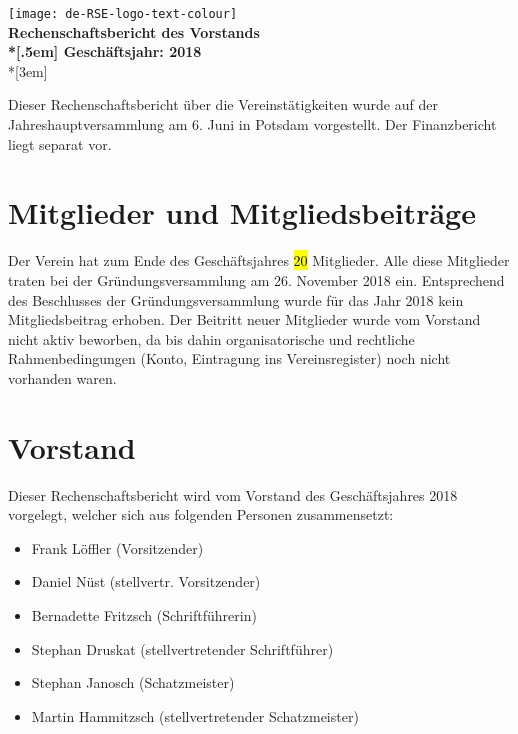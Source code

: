 \newcommand{\jahr}{2018}



\thispagestyle{empty}

\begin{centering}
\texttt{[image: de-RSE-logo-text-colour]}\\
\vspace{3em}
\textbf{
 \Large Rechenschaftsbericht des Vorstands\\*[.5em]
 \normalsize Geschäftsjahr: \jahr}\\*[3em]
\end{centering}



Dieser Rechenschaftsbericht über die Vereinstätigkeiten wurde auf der Jahreshauptversammlung am 6. Juni in Potsdam vorgestellt.
Der Finanzbericht liegt separat vor.

\section{Mitglieder und Mitgliedsbeiträge}

Der Verein hat zum Ende des Geschäftsjahres \hl{20} Mitglieder.
Alle diese Mitglieder traten bei der Gründungsversammlung am 26. November 2018 ein.
Entsprechend des Beschlusses der Gründungsversammlung wurde für das Jahr 2018 kein Mitgliedsbeitrag erhoben.
Der Beitritt neuer Mitglieder wurde vom Vorstand nicht aktiv beworben, da bis dahin organisatorische und rechtliche Rahmenbedingungen (Konto, Eintragung ins Vereinsregister) noch nicht vorhanden waren.

\section{Vorstand}

Dieser Rechenschaftsbericht wird vom Vorstand des Geschäftsjahres 2018 vorgelegt, welcher sich aus folgenden Personen zusammensetzt:

\begin{itemize}
  \item Frank Löffler (Vorsitzender)
  \item Daniel Nüst (stellvertr. Vorsitzender)
  \item Bernadette Fritzsch (Schriftführerin)
  \item Stephan Druskat (stellvertretender Schriftführer)
  \item Stephan Janosch (Schatzmeister)
  \item Martin Hammitzsch (stellvertretender Schatzmeister)
\end{itemize}


